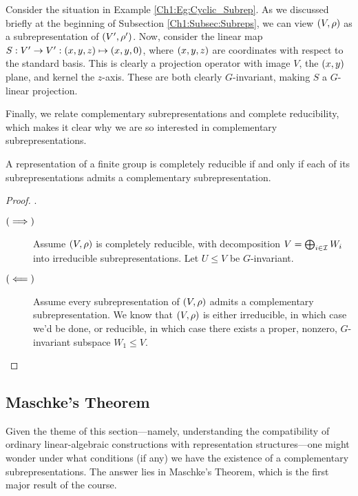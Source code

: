 \begin{boxexample}
    Consider the situation in Example \ref{Ch1:Eg:Cyclic_Subrep}. As we discussed briefly at the beginning of Subsection \ref{Ch1:Subsec:Subreps}, we can view $\left( V, \rho \right)$ as a subrepresentation of $\left( V', \rho' \right)$. Now, consider the linear map $S : V' \to V' : \left( x,y,z \right) \mapsto \left( x,y,0 \right)$, where $\left( x,y,z \right)$ are coordinates with respect to the standard basis. This is clearly a projection operator with image $V$, the $\left( x,y \right)$ plane, and kernel the $z$-axis. These are both clearly $G$-invariant, making $S$ a $G$-linear projection.
\end{boxexample}

Finally, we relate complementary subrepresentations and complete reducibility, which makes it clear why we are so interested in complementary subrepresentations.

\begin{proposition}
    A representation of a finite group is completely reducible if and only if each of its subrepresentations admits a complementary subrepresentation.
\end{proposition}
\begin{proof}
    .
    \begin{description}
        \item[$\left( \implies \right)$] Assume $\left( V, \rho \right)$ is completely reducible, with decomposition $V = \bigoplus_{i \in \mathcal{I}} W_i$ into irreducible subrepresentations. Let $U \leq V$ be $G$-invariant.
        
        \item[$\left( \impliedby \right)$] Assume every subrepresentation of $\left( V, \rho \right)$ admits a complementary subrepresentation. We know that $\left( V, \rho \right)$ is either irreducible, in which case we'd be done, or reducible, in which case there exists a proper, nonzero, $G$-invariant subspace $W_1 \leq V$. 
    \end{description}
\end{proof}

\subsection{Maschke's Theorem}

Given the theme of this section---namely, understanding the compatibility of ordinary linear-algebraic constructions with representation structures---one might wonder under what conditions (if any) we have the existence of a complementary subrepresentations. The answer lies in Maschke's Theorem, which is the first major result of the course.

